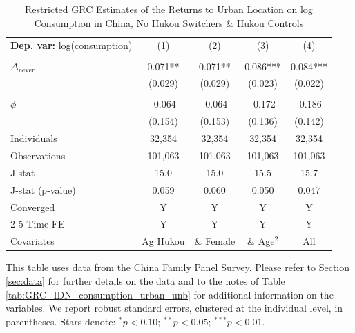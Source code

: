 \begin{table}[htbp] \centering \begin{threeparttable}
 \caption{Restricted GRC Estimates of the Returns to Urban Location on log Consumption in China, No Hukou Switchers & Hukou Controls} 
 \label{tab:GRC_CHN_same_hctrl_consumption_urban_unb} 
\begin{tabular}{l cccc} \toprule  \textbf{Dep. var:}  log(consumption) 
                    &\multicolumn{1}{c}{(1)}   &\multicolumn{1}{c}{(2)}   &\multicolumn{1}{c}{(3)}   &\multicolumn{1}{c}{(4)}   \\
                    &               &               &               &               \\
\addlinespace
$\Delta_{\text{never}}$&       0.071** &       0.071** &       0.086***&       0.084***\\
                    &     (0.029)   &     (0.029)   &     (0.023)   &     (0.022)   \\
                    &               &               &               &               \\
\addlinespace
$\phi$              &      -0.064   &      -0.064   &      -0.172   &      -0.186   \\
                    &     (0.154)   &     (0.153)   &     (0.136)   &     (0.142)   \\
\addlinespace
Individuals         &      32,354   &      32,354   &      32,354   &      32,354   \\
Observations        &     101,063   &     101,063   &     101,063   &     101,063   \\
J-stat              &        15.0   &        15.0   &        15.5   &        15.7   \\
J-stat (p-value)    &       0.059   &       0.060   &       0.050   &       0.047   \\
Converged           &           Y   &           Y   &           Y   &           Y   \\
\cmidrule{2-5} Time FE & Y & Y & Y & Y \\ Covariates & Ag Hukou & \& Female & \& Age$^2$ & All \\ \bottomrule \end{tabular} \begin{tablenotes}[flushleft] \footnotesize \item{This table uses data from the China Family Panel Survey. Please refer to Section \ref{sec:data} for further details on the data and to the notes of Table \ref{tab:GRC_IDN_consumption_urban_unb} for additional information on the variables. We report robust standard errors, clustered at the individual level, in parentheses. Stars denote: $^{*} p<0.10$; $^{**} p<0.05$; $^{***} p<0.01$.} \end{tablenotes} \end{threeparttable} \end{table}
